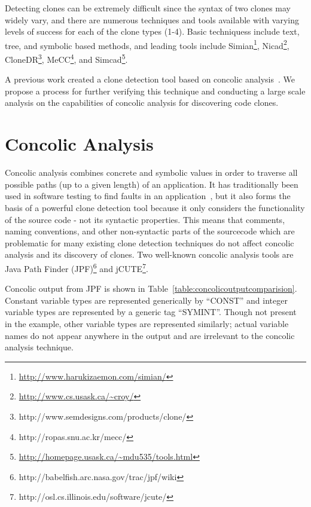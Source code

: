 \documentclass{sig-alternate}
\begin{document}
Detecting clones can be extremely difficult since the syntax of two clones may widely vary, and there are numerous techniques and tools available with varying levels of success for each of the clone types (1-4). Basic techniquess include text, tree, and symbolic based methods, and leading tools include Simian\footnote{\url{http://www.harukizaemon.com/simian/}}, Nicad\footnote{\url{http://www.cs.usask.ca/~croy/}}, CloneDR\footnote{http://www.semdesigns.com/products/clone/}, MeCC\footnote{http://ropas.snu.ac.kr/mecc/}, and Simcad\footnote{\url{http://homepage.usask.ca/~mdu535/tools.html}}.

A previous work created a clone detection tool based on concolic analysis~\cite{6671332}. We propose a process for further verifying this technique and conducting a large scale analysis on the capabilities of concolic analysis for discovering code clones.


\section{Concolic Analysis}

Concolic analysis combines concrete and symbolic values in order to traverse all possible paths (up to a given length) of an application. It has traditionally been used in software testing to find faults in an application~\cite{Kim:2012:IAC:2337223.2337373}, but it also forms the basis of a powerful clone detection tool because it only considers the functionality of the source code - not its syntactic properties. This means that comments, naming conventions, and other non-syntactic parts of the sourcecode which are problematic for many existing clone detection techniques do not affect concolic analysis and its discovery of clones. Two well-known concolic analysis tools are Java Path Finder (JPF)\footnote{http://babelfish.arc.nasa.gov/trac/jpf/wiki} and jCUTE\footnote{http://osl.cs.illinois.edu/software/jcute/}.

Concolic output from JPF is shown in Table~\ref{table:concolicoutputcomparision}. Constant variable types are represented generically by ``CONST'' and integer variable types are represented by a generic tag ``SYMINT''. Though not present in the example, other variable types are represented similarly; actual variable names do not appear anywhere in the output and are irrelevant to the concolic analysis technique.

\end{document}
